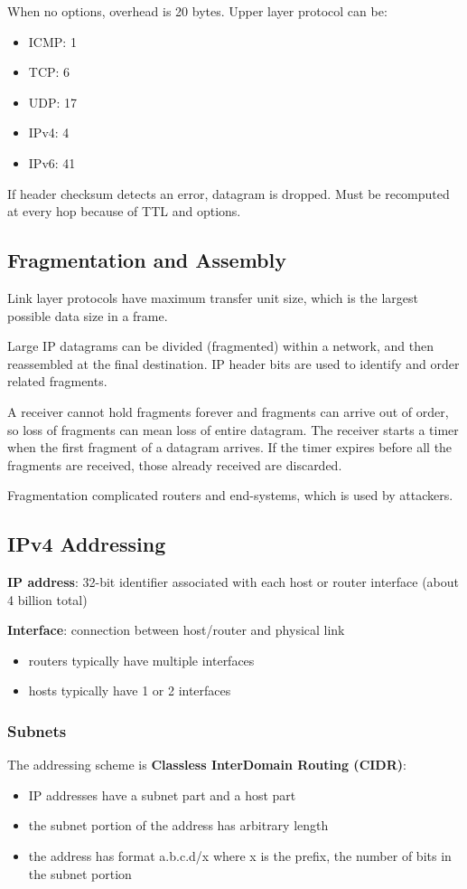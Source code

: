 \documentclass[11pt]{article}
\begin{document}
When no options, overhead is 20 bytes.
Upper layer protocol can be:
\begin{itemize}
\item ICMP: 1
\item TCP: 6
\item UDP: 17
\item IPv4: 4
\item IPv6: 41
\end{itemize}

If header checksum detects an error, datagram is dropped.
Must be recomputed at every hop because of TTL and options.
\subsection{Fragmentation and Assembly}
\label{sec:orgcaaabbc}
Link layer protocols have maximum transfer unit size, which is the largest
possible data size in a frame.

Large IP datagrams can be divided (fragmented) within a network, and then
reassembled at the final destination.
IP header bits are used to identify and order related fragments.

A receiver cannot hold fragments forever and fragments can arrive out of order,
so loss of fragments can mean loss of entire datagram.
The receiver starts a timer when the first fragment of a datagram arrives.
If the timer expires before all the fragments are received, those already
received are discarded.

Fragmentation complicated routers and end-systems, which is used by attackers.
\subsection{IPv4 Addressing}
\label{sec:org92e6644}
\textbf{IP address}: 32-bit identifier associated with each host or router interface
(about 4 billion total)

\textbf{Interface}: connection between host/router and physical link
\begin{itemize}
\item routers typically have multiple interfaces
\item hosts typically have 1 or 2 interfaces
\end{itemize}
\subsubsection{Subnets}
\label{sec:orgc7cd801}
The addressing scheme is \textbf{Classless InterDomain Routing (CIDR)}:
\begin{itemize}
\item IP addresses have a subnet part and a host part
\item the subnet portion of the address has arbitrary length
\item the address has format a.b.c.d/x where x is the prefix, the number
of bits in the subnet portion
\end{itemize}
\end{document}

